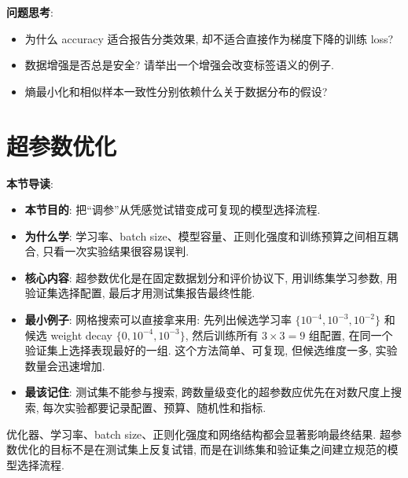 \documentclass{../nndlcourse}
\begin{document}
\textbf{问题思考}:
\begin{itemize}
  \item 为什么 accuracy 适合报告分类效果, 却不适合直接作为梯度下降的训练 loss?
  \item 数据增强是否总是安全? 请举出一个增强会改变标签语义的例子.
  \item 熵最小化和相似样本一致性分别依赖什么关于数据分布的假设?
\end{itemize}

\section{超参数优化}

\textbf{本节导读}:
\begin{itemize}
  \item \textbf{本节目的}: 把“调参”从凭感觉试错变成可复现的模型选择流程.
  \item \textbf{为什么学}: 学习率、batch size、模型容量、正则化强度和训练预算之间相互耦合, 只看一次实验结果很容易误判.
  \item \textbf{核心内容}: 超参数优化是在固定数据划分和评价协议下, 用训练集学习参数, 用验证集选择配置, 最后才用测试集报告最终性能.
  \item \textbf{最小例子}: 网格搜索可以直接拿来用: 先列出候选学习率 $\{10^{-4},10^{-3},10^{-2}\}$ 和候选 weight decay $\{0,10^{-4},10^{-3}\}$, 然后训练所有 $3\times 3=9$ 组配置, 在同一个验证集上选择表现最好的一组. 这个方法简单、可复现, 但候选维度一多, 实验数量会迅速增加.
  \item \textbf{最该记住}: 测试集不能参与搜索, 跨数量级变化的超参数应优先在对数尺度上搜索, 每次实验都要记录配置、预算、随机性和指标.
\end{itemize}

优化器、学习率、batch size、正则化强度和网络结构都会显著影响最终结果. 超参数优化的目标不是在测试集上反复试错, 而是在训练集和验证集之间建立规范的模型选择流程.
\end{document}
